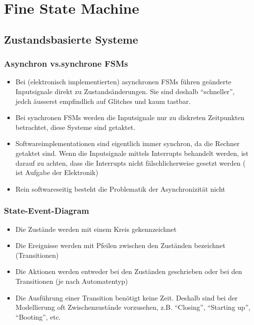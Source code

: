 \section{Fine State Machine}

\subsection{Zustandsbasierte Systeme}

\subsubsection{Asynchron vs.synchrone FSMs }
\begin{itemize}
  \item Bei (elektronisch implementierten) asynchronen FSMs führen geänderte
  Inputsignale direkt zu Zustandsänderungen. Sie sind deshalb "`schneller"',
  jedch äusserst empfindlich auf Glitches und kaum tastbar.
  \item Bei synchronen FSMs werden die Inputsignale nur zu diskreten Zeitpunkten
  betrachtet, diese Systeme sind getaktet.
  \item Softwareimplementationen sind eigentlich immer synchron, da die Rechner
  getaktet sind. Wenn die Inputsignale mittels Interrupts behandelt werden, ist
  darauf zu achten, dass die Interrupts nicht fälschlicherweise gesetzt werden (
  ist Aufgabe der Elektronik)
  \item Rein softwareseitig besteht die Problematik der Asynchronizität nicht
\end{itemize}

\subsubsection{State-Event-Diagram }
\begin{itemize}
  \item Die Zustände werden mit einem Kreis gekennzeichnet
  \item Die Ereignisse werden mit Pfeilen zwischen den Zuständen bezeichnet
  (Transitionen)
  \item Die Aktionen werden entweder bei den Zuständen geschrieben oder bei den
  Transitionen (je nach Automatentyp)
  \item Die Ausführung einer Transition benötigt keine Zeit. Deshalb sind bei
  der Modellierung oft Zwischenzustände vorzusehen, z.B. "`Closing"', "`Starting
  up"', "`Booting"', etc.
\end{itemize}

